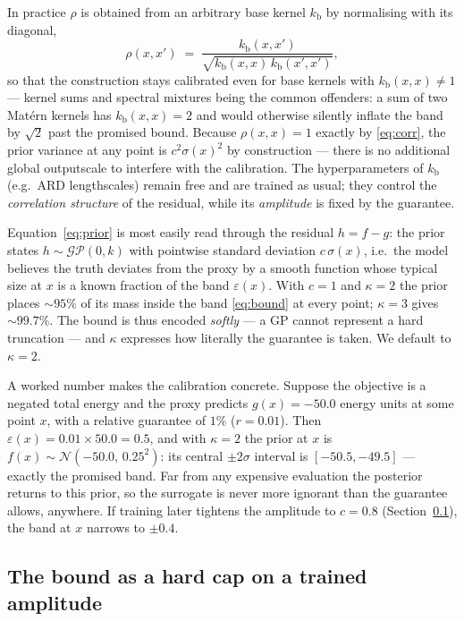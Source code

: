 \documentclass[11pt,a4paper]{article}
\begin{document}
In practice $\rho$ is obtained from an
arbitrary base kernel $k_{\mathrm{b}}$ by normalising with its diagonal,
\begin{equation}
  \label{eq:corr}
  \rho(x, x') \;=\;
  \frac{k_{\mathrm{b}}(x, x')}{\sqrt{k_{\mathrm{b}}(x, x)\,k_{\mathrm{b}}(x', x')}},
\end{equation}
so that the construction stays calibrated even for base kernels with
$k_{\mathrm{b}}(x,x) \neq 1$ --- kernel sums and spectral mixtures being the
common offenders: a sum of two Mat\'ern kernels has $k_{\mathrm{b}}(x,x) = 2$
and would otherwise silently inflate the band by $\sqrt{2}$ past the promised
bound. Because $\rho(x,x) = 1$ exactly by \eqref{eq:corr}, the prior variance
at any point is $c^2 \sigma(x)^2$ by construction --- there is no additional
global outputscale to interfere with the calibration. The hyperparameters of
$k_{\mathrm{b}}$ (e.g.\ ARD lengthscales) remain free and are trained as
usual; they control the \emph{correlation structure} of the residual, while
its \emph{amplitude} is fixed by the guarantee.

Equation~\eqref{eq:prior} is most easily read through the residual
$h = f - g$: the prior states $h \sim \mathcal{GP}(0, k)$ with pointwise
standard deviation $c\,\sigma(x)$, i.e.\ the model believes the truth deviates
from the proxy by a smooth function whose typical size at $x$ is a known
fraction of the band $\varepsilon(x)$. With $c = 1$ and $\kappa = 2$ the prior
places ${\sim}95\%$ of its mass inside the band \eqref{eq:bound} at every
point; $\kappa = 3$ gives ${\sim}99.7\%$. The bound is thus encoded
\emph{softly} --- a GP cannot represent a hard truncation --- and $\kappa$
expresses how literally the guarantee is taken. We default to $\kappa = 2$.

A worked number makes the calibration concrete. Suppose the objective is a
negated total energy and the proxy predicts $g(x) = -50.0$ energy units at
some point $x$, with a relative guarantee of $1\%$ ($r = 0.01$). Then
$\varepsilon(x) = 0.01 \times 50.0 = 0.5$, and with $\kappa = 2$ the prior at
$x$ is $f(x) \sim \mathcal{N}(-50.0,\, 0.25^2)$: its central $\pm 2\sigma$
interval is $[-50.5, -49.5]$ --- exactly the promised band. Far from any
expensive evaluation the posterior returns to this prior, so the surrogate is
never more ignorant than the guarantee allows, anywhere. If training later
tightens the amplitude to $c = 0.8$ (Section~\ref{sec:cap}), the band at $x$
narrows to $\pm 0.4$.

\subsection{The bound as a hard cap on a trained amplitude}
\label{sec:cap}
\end{document}
